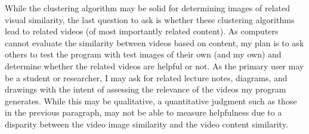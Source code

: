 \documentclass[10pt,twocolumn]{article}
\begin{document}
While the clustering algorithm may be solid for determining images of related visual similarity, the last question to ask is whether these clustering algorithms lead to related videos (of most importantly related content). As computers cannot evaluate the similarity between videos based on content, my plan is to ask others to test the program with test images of their own (and my own) and determine whether the related videos are helpful or not. As the primary user may be a student or researcher, I may ask for related lecture notes, diagrams, and drawings with the intent of assessing the relevance of the videos my program generates. While this may be qualitative, a quantitative judgment such as those in the previous paragraph, may not be able to measure helpfulness due to a disparity between the video image similarity and the video content similarity.


\printbibliography
\end{document}

